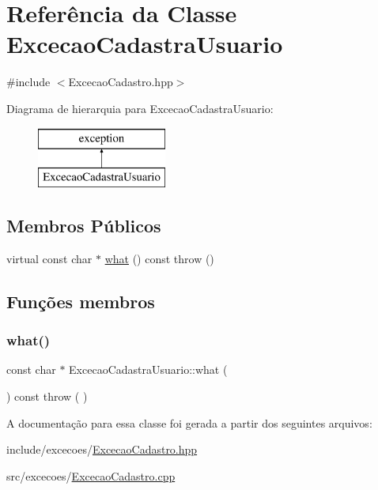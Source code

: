 \hypertarget{class_excecao_cadastra_usuario}{}\section{Referência da Classe Excecao\+Cadastra\+Usuario}
\label{class_excecao_cadastra_usuario}


{\ttfamily \#include $<$Excecao\+Cadastro.\+hpp$>$}

Diagrama de hierarquia para Excecao\+Cadastra\+Usuario\+:\begin{figure}[H]
\begin{center}
\leavevmode
\includegraphics[height=2.000000cm]{class_excecao_cadastra_usuario}
\end{center}
\end{figure}
\subsection*{Membros Públicos}
\begin{DoxyCompactItemize}
\item 
virtual const char $\ast$ \mbox{\hyperlink{class_excecao_cadastra_usuario_a2e0b39c2aafe332e49596a293453d487}{what}} () const  throw ()
\end{DoxyCompactItemize}


\subsection{Funções membros}
\mbox{\label{class_excecao_cadastra_usuario_a2e0b39c2aafe332e49596a293453d487}} 
\subsubsection{\texorpdfstring{what()}{what()}}
{\footnotesize\ttfamily const char $\ast$ Excecao\+Cadastra\+Usuario\+::what (\begin{DoxyParamCaption}{ }\end{DoxyParamCaption}) const throw ( ) \hspace{0.3cm}{\ttfamily [virtual]}}



A documentação para essa classe foi gerada a partir dos seguintes arquivos\+:\begin{DoxyCompactItemize}
\item 
include/excecoes/\mbox{\hyperlink{_excecao_cadastro_8hpp}{Excecao\+Cadastro.\+hpp}}\item 
src/excecoes/\mbox{\hyperlink{_excecao_cadastro_8cpp}{Excecao\+Cadastro.\+cpp}}\end{DoxyCompactItemize}
